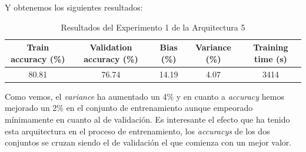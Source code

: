 \documentclass{article}
\begin{document}
			Y obtenemos los siguientes resultados:
			\begin{table}[!h]
				\begin{center}
					\begin{tabular}{| c | c | c | c | c |}
						\textbf{Train accuracy (\%)} & \textbf{Validation accuracy (\%)} & \textbf{Bias (\%)} & \textbf{Variance (\%)} & \textbf{Training time (s)} \\ \hline
						80.81 & 76.74 & 14.19 & 4.07 & 3414\\ \hline
					\end{tabular}
					\caption{Resultados del Experimento 1 de la Arquitectura 5}
					\label{tab:res-d-a5-e1}
				\end{center}
			\end{table}
		    
		    Como vemos, el \textit{variance} ha aumentado un 4\% y en cuanto a \textit{accuracy} hemos mejorado un 2\% en el conjunto de entrenamiento aunque empeorado m\'inimamente en cuanto al de validaci\'on. Es interesante el efecto que ha tenido esta arquitectura en el proceso de entrenamiento, los \textit{accuracys} de los dos conjuntos se cruzan siendo el de validaci\'on el que comienza con un mejor valor.
		    
\end{document}
